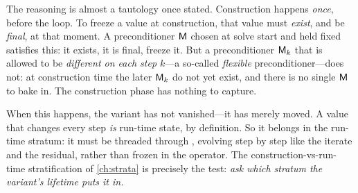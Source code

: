 The reasoning is almost a tautology once stated. Construction happens \emph{once},
before the loop. To freeze a value at construction, that value must \emph{exist}, and
be \emph{final}, at that moment. A preconditioner $\mathsf{M}$ chosen at solve start and
held fixed satisfies this: it exists, it is final, freeze it. But a preconditioner
$\mathsf{M}_k$ that is allowed to be \emph{different on each step $k$}---a so-called
\emph{flexible} preconditioner---does not: at construction time the later $\mathsf{M}_k$
do not yet exist, and there is no single $\mathsf{M}$ to bake in. The construction phase
has nothing to capture.

When this happens, the variant has not vanished---it has merely moved. A value that
changes every step \emph{is} run-time state, by definition. So it belongs in the
run-time stratum: it must be threaded through , evolving step by step
like the iterate and the residual, rather than frozen in the operator. The
construction-vs-run-time stratification of \cref{ch:strata} is precisely the test:
\emph{ask which stratum the variant's lifetime puts it in.}

